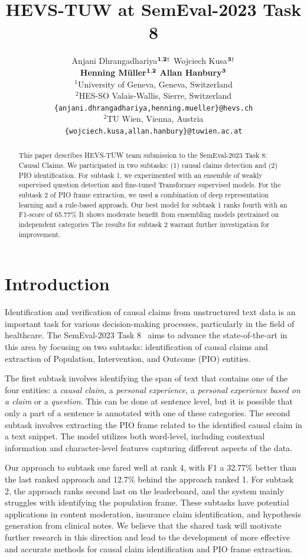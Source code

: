 \documentclass[11pt]{article}
\title{HEVS-TUW at SemEval-2023 Task 8}
\author{Anjani Dhrangadhariya\hspace{1pt}$^{{{\bf 1,2}}\dag}$ \hspace{.7cm} Wojciech Kusa\hspace{1pt}$^{{\bf 3}\dag}$ \\[0.15cm] {\bf Henning Müller\hspace{1pt}$^{{\bf 1,2}}$}  \hspace{.7cm}  {\bf Allan Hanbury\hspace{1pt}$^{{\bf 3}}$}
\\[0.4cm]
{$^1$University of Geneva, Geneva, Switzerland} \\
{$^2$HES-SO Valais-Wallis, Sierre, Switzerland} \\
{\tt \{anjani.dhrangadhariya,henning.mueller\}@hevs.ch} \\
{$^2$TU Wien, Vienna, Austria} \\
{\tt \{wojciech.kusa,allan.hanbury\}@tuwien.ac.at} \\
}
\begin{document}
\maketitle
{\let\thefootnote\relax{}}

\begin{abstract}
This paper describes HEVS-TUW team submission to the SemEval-2023 Task 8: Causal Claims.
We participated in two subtasks: (1) causal claims detection and (2)  PIO identification.
For subtask 1, we experimented with an ensemble of weakly supervised question detection and fine-tuned Transformer supervised models.
For the subtask 2 of PIO frame extraction, we used a combination of deep representation learning and a rule-based approach. 
Our best model for subtask 1 ranks fourth with an F1-score of 65.77\% 
It shows moderate benefit from ensembling models pretrained on independent categories
The results for subtask 2 warrant further investigation for improvement.

\end{abstract}

\section{Introduction}

% 
Identification and verification of causal claims from unstructured text data is an important task for various decision-making processes, particularly in the field of healthcare. The SemEval-2023 Task 8~\cite{CausalClaims} aims to advance the state-of-the-art in this area by focusing on two subtasks: identification of causal claims and extraction of Population, Intervention, and Outcome (PIO) entities.

% 
The first subtask involves identifying the span of text that contains one of the four entities: a \emph{causal claim}, a \emph{personal experience}, a \emph{personal experience based on a claim} or a \emph{question}. 
This can be done at sentence level, but it is possible that only a part of a sentence is annotated with one of these categories. 
The second subtask involves extracting the PIO frame related to the identified causal claim in a text snippet.
The model utilizes both word-level, including contextual information and character-level features capturing different aspects of the data.

Our approach to subtask one fared well at rank 4, with F1 a 32.77\% better than the last ranked approach and 12.7\% behind the approach ranked 1.
For subtask 2, the approach ranks second last on the leaderboard, and the system mainly struggles with identifying the population frame.
These subtasks have potential applications in content moderation, insurance claim identification, and hypothesis generation from clinical notes.
We believe that the shared task will motivate further research in this direction and lead to the development of more effective and accurate methods for causal claim identification and PIO frame extraction.
%
%
%
\end{document}
